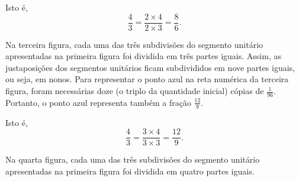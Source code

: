 \begin{refletindo*}
\begin{center}
\end{center}


Isto é,
$$\dfrac{4}{3} = \dfrac{2 \times 4}{2 \times 3} = \dfrac{8}{6}.$$

Na terceira figura, cada uma das três subdivisões do segmento unitário apresentadas na primeira figura foi dividida em três partes iguais. Assim, as justaposições dos segmentos unitários ficam subdivididos em nove partes iguais, ou seja, em nonos. Para representar o ponto azul na reta numérica da terceira figura, foram necessárias doze (o triplo da quantidade inicial) cópias de $\frac{1}{96}$. Portanto, o ponto azul representa também a fração $\frac{12}{9}$.

\begin{center}
\end{center}


Isto é,
$$\dfrac{4}{3} = \dfrac{3 \times 4}{3 \times 3} = \dfrac{12}{9}.$$

Na quarta figura, cada uma das três subdivisões do segmento unitário apresentadas na primeira figura foi dividida em quatro partes iguais.


\end{refletindo*}

